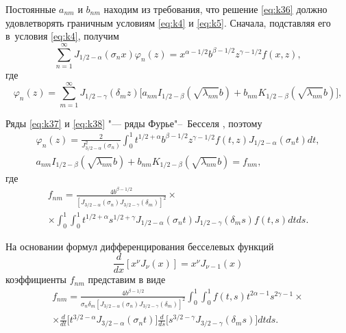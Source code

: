 Постоянные $a_{nm} $ и $b_{nm} $ находим из требования, что решение \eqref{eq:k36} должно удовлетворять граничным условиям \eqref{eq:k4} и \eqref{eq:k5}. 
Сначала, подставляя его в~условия \eqref{eq:k4}, получим
\begin{equation}
\sum\limits_{n=1}^\infty{J_{ 1/2 -\alpha}(\sigma_n x)}\varphi_n(z)=x^{\alpha- 1/2 }b^{\beta- 1/2 }z^{\gamma- 1/2 }f(x,z),
\label{eq:k37}
\end{equation}
где
\begin{equation}
\varphi_n(z)=\sum\limits_{m=1}^\infty 
J_{ 1/2 -\gamma}(\delta_m z)
\bigl[a_{nm}I_{ 1/2 -\beta}(\sqrt{\lambda_{nm}}b)+b_{nm}K_{ 1/2 -\beta}(\sqrt{\lambda_{nm}}b)\bigr],
\label{eq:k38}
\end{equation}


Ряды \eqref{eq:k37} и \eqref{eq:k38} "--- ряды Фурье"--~Бесселя \cite[\S 18.1]{uk:bib:Vatson}, поэтому 
\begin{gather}
\varphi_n(z)=\frac{2}{J_{3/2-\alpha}^2(\sigma_n)}\int_0^1{t^{ 1/2 +\alpha}b^{\beta- 1/2 }z^{\gamma- 1/2 }f(t,z)J_{ 1/2 -\alpha}(\sigma_n t)dt},
\\
a_{nm}I_{ 1/2 -\beta}(\sqrt{\lambda_{nm}}b)+b_{nm}K_{ 1/2 -\beta}(\sqrt{\lambda_{nm}}b)=f_{nm},
\label{eq:k39}
\end{gather}
где
\begin{multline*}
f_{nm}=\frac{4b^{\beta- 1/2 }}{[J_{3/2-\alpha}(\sigma_n)J_{3/2-\gamma}(\delta_m)]^2}\times  
\\
\times\int_0^1{\int_0^1{t^{ 1/2 +\alpha}s^{ 1/2 +\gamma}J_{ 1/2 -\alpha}(\sigma_n t)J_{ 1/2 -\gamma}(\delta_m s)f(t,s)dtds}}.
 \end{multline*}


	На основании формул дифференцирования бесселевых функций \cite[\S~3.2]{uk:bib:Vatson} 
	$$\frac{d}{dx}[x^\nu J_\nu(x)]=x^\nu J_{\nu-1}(x)$$ 
коэффициенты $f_{nm} $ представим в виде
\begin{multline} 
f_{nm}=\frac{4b^{\beta- 1/2 }}
{\sigma_n\delta_m[J_{3/2-\alpha}(\sigma_n)J_{3/2-\gamma} (\delta_m)]^2}
\int_0^1\int_0^1 f(t,s)t^{2\alpha-1}s^{2\gamma-1}\times
\\
\times\frac{d}{dt} \bigl[t^{3/2-\alpha}J_{3/2-\alpha}(\sigma_n t) \bigr]
\frac{d}{ds} \bigl[s^{3/2-\gamma} J_{3/2-\gamma}(\delta_m s)\bigr]dtds.
\label{eq:k40}
\end{multline}

 


